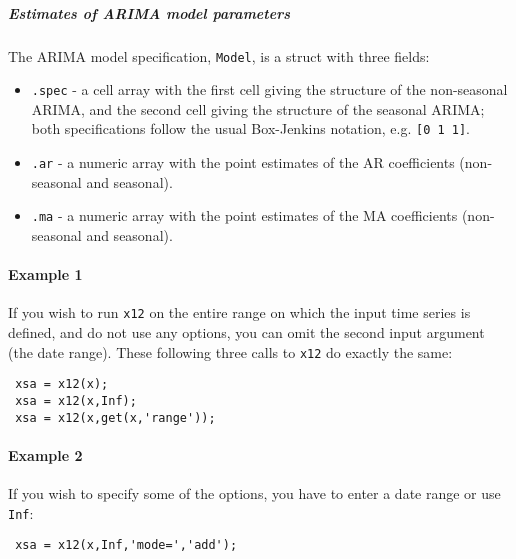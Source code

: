  \subparagraph{Estimates of ARIMA model parameters}
 
 The ARIMA model specification, \texttt{Model}, is a struct with three
 fields:
 
 \begin{itemize}
 \item
   \texttt{.spec} - a cell array with the first cell giving the structure
   of the non-seasonal ARIMA, and the second cell giving the structure of
   the seasonal ARIMA; both specifications follow the usual Box-Jenkins
   notation, e.g. \texttt{{[}0 1 1{]}}.
 \item
   \texttt{.ar} - a numeric array with the point estimates of the AR
   coefficients (non-seasonal and seasonal).
 \item
   \texttt{.ma} - a numeric array with the point estimates of the MA
   coefficients (non-seasonal and seasonal).
 \end{itemize}
 
 \paragraph{Example 1}
 
 If you wish to run \texttt{x12} on the entire range on which the input
 time series is defined, and do not use any options, you can omit the
 second input argument (the date range). These following three calls to
 \texttt{x12} do exactly the same:
 
 \begin{verbatim}
 xsa = x12(x);
 xsa = x12(x,Inf);
 xsa = x12(x,get(x,'range'));
 \end{verbatim}
 
 \paragraph{Example 2}
 
 If you wish to specify some of the options, you have to enter a date
 range or use \texttt{Inf}:
 
 \begin{verbatim}
 xsa = x12(x,Inf,'mode=','add');
 \end{verbatim}


